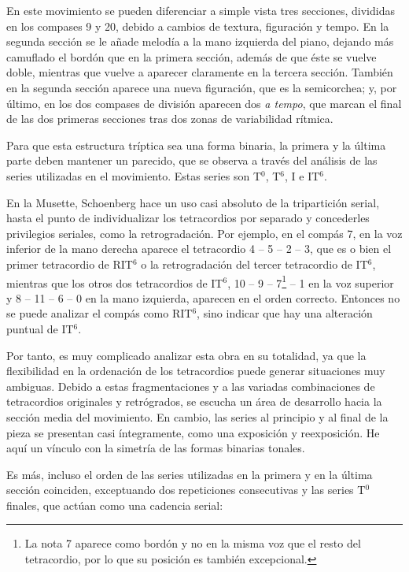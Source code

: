 		En este movimiento se pueden diferenciar a simple vista tres secciones, divididas en los compases 9 y 20, debido a cambios de textura, figuración y tempo. En la segunda sección se le añade melodía a la mano izquierda del piano, dejando más camuflado el bordón que en la primera sección, además de que éste se vuelve doble, mientras que vuelve a aparecer claramente en la tercera sección. También en la segunda sección aparece una nueva figuración, que es la semicorchea; y, por último, en los dos compases de división aparecen dos \emph{a tempo}, que marcan el final de las dos primeras secciones tras dos zonas de variabilidad rítmica.
		\cite{clercq}
		
		Para que esta estructura tríptica sea una forma binaria, la primera y la última parte deben mantener un parecido, que se observa a través del análisis de las series utilizadas en el movimiento. Estas series son T$^0$, T$^6$, I e IT$^6$.
		
		En la Musette, Schoenberg hace un uso casi absoluto de la tripartición serial, hasta el punto de individualizar los tetracordios por separado y concederles privilegios seriales, como la retrogradación. Por ejemplo, en el compás 7, en la voz inferior de la mano derecha aparece el tetracordio 4 -- 5 -- 2 -- 3, que es o bien el primer tetracordio de RIT$^6$ o la retrogradación del tercer tetracordio de IT$^6$, mientras que los otros dos tetracordios de IT$^6$, 10 -- 9 -- 7\footnote{La nota 7 aparece como bordón y no en la misma voz que el resto del tetracordio, por lo que su posición es también excepcional.} -- 1 en la voz superior y 8 -- 11 -- 6 -- 0 en la mano izquierda, aparecen en el orden correcto. Entonces no se puede analizar el compás como RIT$^6$, sino indicar que hay una alteración puntual de IT$^6$.
		
		Por tanto, es muy complicado analizar esta obra en su totalidad, ya que la flexibilidad en la ordenación de los tetracordios puede generar situaciones muy ambiguas. Debido a estas fragmentaciones y a las variadas combinaciones de tetracordios originales y retrógrados, se escucha un área de desarrollo hacia la sección media del movimiento. En cambio, las series al principio y al final de la pieza se presentan casi íntegramente, como una exposición y reexposición. He aquí un vínculo con la simetría de las formas binarias tonales.
		\cite{clercq}
		
		Es más, incluso el orden de las series utilizadas en la primera y en la última sección coinciden, exceptuando dos repeticiones consecutivas y las series T$^0$ finales, que actúan como una cadencia serial:
		
